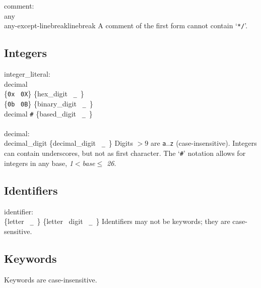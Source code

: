 \grammarstart
comment: \\
       \>{\tt{}/*} any\SERIESOPT {\tt{}*/} \\
\orbox \>{\tt{}//} any-except-linebreak\SERIESOPT linebreak
\grammarend
A comment of the first form cannot contain `{\tt{}*/}'.

\subsection{Integers}\label{sec:inttoken}

\grammarstart
integer\_literal: \\
       \>decimal \\
\orbox \>\{{\tt{}0x} \orbox \ {\tt{}0X}\} \{hex\_digit \orbox \ {\tt{}\_}\ \}\SERIES \\
\orbox \>\{{\tt{}0b} \orbox \ {\tt{}0B}\} \{binary\_digit \orbox \ {\tt{}\_}\ \}\SERIES \\
\orbox \>decimal {\tt{}\#} \{based\_digit \orbox \ {\tt{}\_}\ \}\SERIES \\
 \\
decimal: \\
      \>decimal\_digit \{decimal\_digit \orbox \ {\tt{}\_}\ \}\SERIESOPT
\grammarend
Digits $>9$ are {\tt{}a}..{\tt{}z} (case-insensitive). Integers can contain underscores,
but not as first character. The `{\tt{}\#}' notation allows for integers in
any base, {\it{}1$<$base$\le$ 26}.

\subsection{Identifiers}\label{sec:idtoken}

\grammarstart
identifier: \\
      \>\{letter \orbox \ {\tt{}\_}\ \} \{letter \orbox \ digit \orbox \ {\tt{}\_}\ \}\SERIESOPT
\grammarend
Identifiers may not be keywords; they are case-sensitive.

\subsection{Keywords}\label{sec:kwtoken}

Keywords are case-insensitive.


